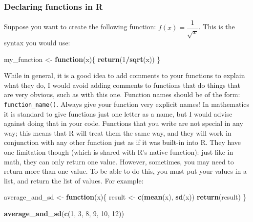 \documentclass[]{gitbook}
\newenvironment{Shaded}{\begin{snugshade}}{\end{snugshade}}
\newcommand{\ControlFlowTok}[1]{\textcolor[rgb]{0.13,0.29,0.53}{\textbf{#1}}}
\newcommand{\DecValTok}[1]{\textcolor[rgb]{0.00,0.00,0.81}{#1}}
\newcommand{\KeywordTok}[1]{\textcolor[rgb]{0.13,0.29,0.53}{\textbf{#1}}}
\newcommand{\NormalTok}[1]{#1}
\newcommand{\OperatorTok}[1]{\textcolor[rgb]{0.81,0.36,0.00}{\textbf{#1}}}
\newcommand{\StringTok}[1]{\textcolor[rgb]{0.31,0.60,0.02}{#1}}
\theoremstyle{definition}
\theoremstyle{definition}
\theoremstyle{definition}
\theoremstyle{remark}
\begin{document}
\hypertarget{declaring-functions-in-r}{%
\subsubsection{Declaring functions in
R}\label{declaring-functions-in-r}}

Suppose you want to create the following function:
\(f(x) = \dfrac{1}{\sqrt{x}}\). This is the syntax you would use:

\begin{Shaded}
\begin{Highlighting}[]
\NormalTok{my_function <-}\StringTok{ }\ControlFlowTok{function}\NormalTok{(x)\{}
\KeywordTok{return}\NormalTok{(}\DecValTok{1}\OperatorTok{/}\KeywordTok{sqrt}\NormalTok{(x))}
\NormalTok{\}}
\end{Highlighting}
\end{Shaded}

While in general, it is a good idea to add comments to your functions to
explain what they do, I would avoid adding comments to functions that do
things that are very obvious, such as with this one. Function names
should be of the form: \texttt{function\_name()}. Always give your
function very explicit names! In mathematics it is standard to give
functions just one letter as a name, but I would advise against doing
that in your code. Functions that you write are not special in any way;
this means that R will treat them the same way, and they will work in
conjunction with any other function just as if it was built-in into R.
They have one limitation though (which is shared with R's native
function): just like in math, they can only return one value. However,
sometimes, you may need to return more than one value. To be able to do
this, you must put your values in a list, and return the list of values.
For example:

\begin{Shaded}
\begin{Highlighting}[]
\NormalTok{average_and_sd <-}\StringTok{ }\ControlFlowTok{function}\NormalTok{(x)\{}
\NormalTok{  result <-}\StringTok{ }\KeywordTok{c}\NormalTok{(}\KeywordTok{mean}\NormalTok{(x), }\KeywordTok{sd}\NormalTok{(x))}
\KeywordTok{return}\NormalTok{(result)}
\NormalTok{\}}

\KeywordTok{average_and_sd}\NormalTok{(}\KeywordTok{c}\NormalTok{(}\DecValTok{1}\NormalTok{, }\DecValTok{3}\NormalTok{, }\DecValTok{8}\NormalTok{, }\DecValTok{9}\NormalTok{, }\DecValTok{10}\NormalTok{, }\DecValTok{12}\NormalTok{))}
\end{Highlighting}
\end{Shaded}
\end{document}
